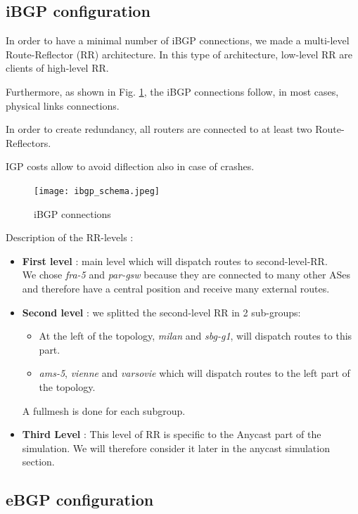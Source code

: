 \documentclass[letter, 9pt, conference]{ieeeconf}
\begin{document}
\subsection{iBGP configuration}
\label{sec:ibgp}

In order to have a minimal number of iBGP connections, we made a multi-level Route-Reflector (RR) architecture. In this type of architecture, low-level RR are clients of high-level RR.

Furthermore, as shown in Fig. \ref{fig:ibgp_schema}, the iBGP connections follow, in most cases, physical links connections. 

In order to create redundancy, all routers are connected to at least two Route-Reflectors. 

IGP costs allow to avoid diflection also in case of crashes. 

\begin{figure}[h!]
    \texttt{[image: ibgp\_schema.jpeg]}
    \caption{iBGP connections}
    \label{fig:ibgp_schema}
\end{figure}

Description of the RR-levels : 
\begin{itemize}
    \item \textbf{First level} : main level which will dispatch routes to second-level-RR. \\
    We chose \textit{fra-5} and \textit{par-gsw} because they are connected to many other ASes and therefore have a central position and receive many external routes. 
    \item \textbf{Second level} : we splitted the second-level RR in 2 sub-groups:
    \begin{itemize}
        \item At the left of the topology, \textit{milan} and \textit{sbg-g1}, will dispatch routes to this part. 
        \item \textit{ams-5}, \textit{vienne} and \textit{varsovie} which will dispatch routes to the left part of the topology. 
    \end{itemize}
    A fullmesh is done for each subgroup. 

    \item \textbf{Third Level} : This level of RR is specific to the Anycast part of the simulation. We will therefore consider it later in the anycast simulation section.
\end{itemize}

\subsection{eBGP configuration}
\label{sec:ebgp}
\end{document}

